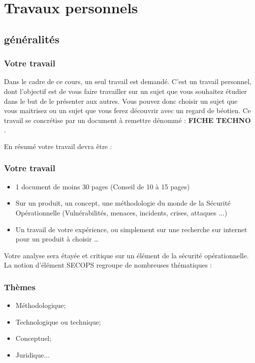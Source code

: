 %                            
%

\section{Travaux personnels}

\subsection{généralités}

\begin{frame}
\frametitle<presentation>{Votre travail}
Dans le cadre de ce cours, un seul travail  est demandé. C'est un travail personnel, dont l'objectif est de vous faire travailler sur un sujet que vous souhaitez étudier dans le but de le présenter aux autres. Vous pouvez donc choisir un sujet que vous maitrisez ou un sujet que vous ferez découvrir avec un regard de béotien.
Ce travail se concrétise par un document à remettre dénommé : \textbf{FICHE TECHNO} .
\end{frame}

En résumé votre travail devra être : 

\begin{frame}
\frametitle<presentation>{Votre travail}
\begin{itemize}
  \item  1 document de moins 30 pages (Conseil de 10 à 15 pages)
  \item  Sur un produit, un concept, une méthodologie du monde de la Sécurité Opérationnelle (Vulnérabilités, menaces, incidents, crises, attaques ...)
  \item  Un travail de votre expérience, ou simplement sur une recherche sur internet pour un produit à choisir … 
\end{itemize}


\end{frame}

Votre  analyse sera étayée et critique sur un élément de la sécurité opérationnelle. La notion d'élément SECOPS regroupe de nombreuses thématiques :
\begin{frame}
\frametitle<presentation>{Thèmes}
\begin{itemize}
  \item Méthodologique;
  \item Technologique ou technique;
  \item Conceptuel;
  \item Juridique...
\end{itemize}

\end{frame}

